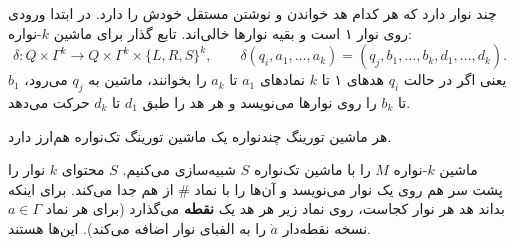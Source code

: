  چند نوار دارد که هر کدام هد خواندن و نوشتن مستقل خودش را دارد. در ابتدا ورودی روی نوار ۱ است و بقیه نوارها خالی‌اند. تابع گذار برای ماشین $k$-نواره:
\[\delta:Q\times\Gamma^k\to Q\times\Gamma^k\times\{L,R,S\}^k,\qquad
\delta(q_i,a_1,\dots,a_k)=(q_j,b_1,\dots,b_k,d_1,\dots,d_k).\]
یعنی اگر در حالت $q_i$ هدهای ۱ تا $k$ نمادهای $a_1$ تا $a_k$ را بخوانند، ماشین به $q_j$ می‌رود، $b_1$ تا $b_k$ را روی نوارها می‌نویسد و هر هد را طبق $d_1$ تا $d_k$ حرکت می‌دهد.

\begin{theorem}\label{thm:multitape}
هر ماشین تورینگ چندنواره یک ماشین تورینگ تک‌نواره هم‌ارز دارد.
\end{theorem}

\begin{proofidea}
ماشین $k$-نواره $M$ را با ماشین تک‌نواره $S$ شبیه‌سازی می‌کنیم. $S$ محتوای $k$ نوار را پشت سر هم روی یک نوار می‌نویسد و آن‌ها را با نماد $\#$ از هم جدا می‌کند. برای اینکه بداند هد هر نوار کجاست، روی نماد زیر هر هد یک \textbf{نقطه} می‌گذارد (برای هر نماد $a\in\Gamma$ نسخه نقطه‌دار $\dot a$ را به الفبای نوار اضافه می‌کند). این‌ها  هستند.
\begin{ltrfig}
\end{ltrfig}
\end{proofidea}

